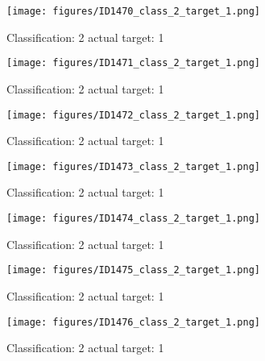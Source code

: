 \begin{figure}[h!]
\begin{center}
\texttt{[image: figures/ID1470\_class\_2\_target\_1.png]}
\end{center}
\caption{ Classification: 2 actual target: 1}
\label{fig:ID1470_class_2_target_1}
\end{figure}
\begin{figure}[h!]
\begin{center}
\texttt{[image: figures/ID1471\_class\_2\_target\_1.png]}
\end{center}
\caption{ Classification: 2 actual target: 1}
\label{fig:ID1471_class_2_target_1}
\end{figure}
\begin{figure}[h!]
\begin{center}
\texttt{[image: figures/ID1472\_class\_2\_target\_1.png]}
\end{center}
\caption{ Classification: 2 actual target: 1}
\label{fig:ID1472_class_2_target_1}
\end{figure}
\begin{figure}[h!]
\begin{center}
\texttt{[image: figures/ID1473\_class\_2\_target\_1.png]}
\end{center}
\caption{ Classification: 2 actual target: 1}
\label{fig:ID1473_class_2_target_1}
\end{figure}
\begin{figure}[h!]
\begin{center}
\texttt{[image: figures/ID1474\_class\_2\_target\_1.png]}
\end{center}
\caption{ Classification: 2 actual target: 1}
\label{fig:ID1474_class_2_target_1}
\end{figure}
\begin{figure}[h!]
\begin{center}
\texttt{[image: figures/ID1475\_class\_2\_target\_1.png]}
\end{center}
\caption{ Classification: 2 actual target: 1}
\label{fig:ID1475_class_2_target_1}
\end{figure}
\begin{figure}[h!]
\begin{center}
\texttt{[image: figures/ID1476\_class\_2\_target\_1.png]}
\end{center}
\caption{ Classification: 2 actual target: 1}
\label{fig:ID1476_class_2_target_1}
\end{figure}

